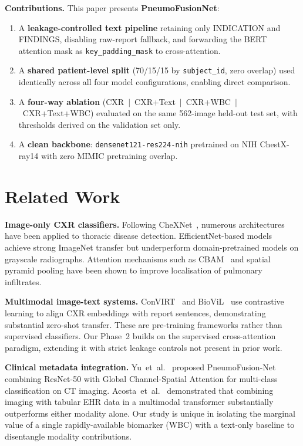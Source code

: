 \documentclass[conference]{IEEEtran}
\begin{document}
\textbf{Contributions.} This paper presents \textbf{PneumoFusionNet}:
\begin{enumerate}[noitemsep, leftmargin=*]
  \item A \textbf{leakage-controlled text pipeline} retaining only INDICATION and FINDINGS, disabling raw-report fallback, and forwarding the BERT attention mask as \texttt{key\_padding\_mask} to cross-attention.
  \item A \textbf{shared patient-level split} (70/15/15 by \texttt{subject\_id}, zero overlap) used identically across all four model configurations, enabling direct comparison.
  \item A \textbf{four-way ablation} (CXR~$|$~CXR+Text~$|$~CXR+WBC~$|$~CXR+Text+WBC) evaluated on the same 562-image held-out test set, with thresholds derived on the validation set only.
  \item A \textbf{clean backbone}: \texttt{densenet121-res224-nih} pretrained on NIH ChestX-ray14 with zero MIMIC pretraining overlap.
\end{enumerate}

\section{\textcolor{aideep}{Related Work}}

\textbf{Image-only CXR classifiers.} Following CheXNet~\cite{rajpurkar2017chexnet}, numerous architectures have been applied to thoracic disease detection. EfficientNet-based models~\cite{tan2019efficientnet} achieve strong ImageNet transfer but underperform domain-pretrained models on grayscale radiographs. Attention mechanisms such as CBAM~\cite{woo2018cbam} and spatial pyramid pooling have been shown to improve localisation of pulmonary infiltrates.

\textbf{Multimodal image-text systems.} ConVIRT~\cite{zhang2020contrastive} and BioViL~\cite{bannur2023knowledge} use contrastive learning to align CXR embeddings with report sentences, demonstrating substantial zero-shot transfer. These are pre-training frameworks rather than supervised classifiers. Our Phase~2 builds on the supervised cross-attention paradigm, extending it with strict leakage controls not present in prior work.

\textbf{Clinical metadata integration.} Yu~et~al.~\cite{frontiers2025pneumofusion} proposed PneumoFusion-Net combining ResNet-50 with Global Channel-Spatial Attention for multi-class classification on CT imaging. Acosta~et~al.~\cite{acosta2022multimodal} demonstrated that combining imaging with tabular EHR data in a multimodal transformer substantially outperforms either modality alone. Our study is unique in isolating the marginal value of a single rapidly-available biomarker (WBC) with a text-only baseline to disentangle modality contributions.
\end{document}

